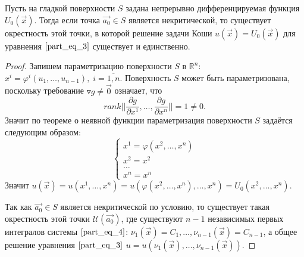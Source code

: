 \begin{theorem}
    Пусть на гладкой поверхности $S$ задана непрерывно дифференцируемая функция $U_0 \left( \overrightarrow{x} \right)$. Тогда если точка $\overrightarrow{a_0} \in S$ является некритической, то существует окрестность этой точки, в которой решение задачи Коши $u \left( \overrightarrow{x} \right) = U_0 \left( \overrightarrow{x} \right)$ для уравнения $\eqref{part_eq_3}$ существует и единственно.
\end{theorem}
\begin{proof}
    Запишем параметризацию поверхности $S$ в $\mathbb{R}^n$: $x^i = \varphi^i \left( u_1, \dots, u_{n - 1} \right), \; i = \overline{1, n}$. Поверхность $S$ может быть параметризована, поскольку требование $\triangledown g \neq \overrightarrow{0}$ означает, что 
    \begin{equation*}
        rank \bigg| \bigg| \frac{\partial g}{\partial x^{1}}, \dots, \frac{\partial g}{\partial x^{n}} \bigg| \bigg| = 1 \neq 0.
    \end{equation*}
    Значит по теореме о неявной функции параметризация поверхности $S$ задаётся следующим образом:
    \begin{equation*}
        \begin{cases}
            x^1 = \varphi \left( x^2, \dots, x^n \right) \\
            x^2 = x^2                                    \\
            \dots                                        \\
            x^n = x^n
        \end{cases}
    \end{equation*}
    Значит $u \left( \overrightarrow{x} \right) = u \left( x^1, \dots, x^n \right) = u \left( \varphi \left( x^2, \dots, x^n \right), \dots, x^n \right) = U_0 \left( x^2, \dots, x^n \right)$.

    Так как $\overrightarrow{a_0} \in S$ является некритической по условию, то существует такая окрестность этой точки $\mathcal{U}  \left( \overrightarrow{a_0} \right)$, где существуют $n - 1$ независимых первых интегралов системы $\eqref{part_eq_4}$: $\nu_1 \left( \overrightarrow{x} \right) = C_1, \dots, \nu_{n - 1} \left( \overrightarrow{x} \right) = C_{n - 1}$, а общее решение уравнения $\eqref{part_eq_3}$ $u = u \left( \nu_1 \left( \overrightarrow{x} \right), \dots, \nu_{n - 1} \left( \overrightarrow{x} \right) \right)$. 


\end{proof}
